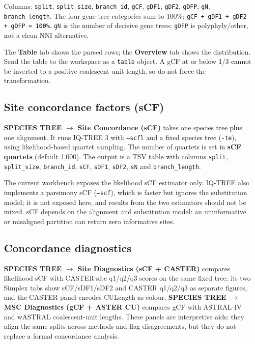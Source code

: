 \documentclass[10pt]{report}
\begin{document}
Columns: \texttt{split}, \texttt{split\_size}, \texttt{branch\_id},
\texttt{gCF}, \texttt{gDF1}, \texttt{gDF2}, \texttt{gDFP}, \texttt{gN},
\texttt{branch\_length}. The four gene-tree categories sum to 100\%:
\texttt{gCF + gDF1 + gDF2 + gDFP = 100\%}. \texttt{gN} is the number of
decisive gene trees; \texttt{gDFP} is polyphyly/other, not a clean NNI
alternative.

The \textbf{Table} tab shows the parsed rows; the \textbf{Overview} tab shows
the distribution. Send the table to the workspace as a \texttt{table} object.
A gCF at or below 1/3 cannot be inverted to a positive coalescent-unit length,
so do not force the transformation.

\subsection{Site concordance factors (sCF)}

\textbf{SPECIES TREE $\rightarrow$ Site Concordance (sCF)} takes one species
tree plus one alignment. It runs IQ-TREE 3 with \texttt{--scfl} and a fixed
species tree (\texttt{-te}), using likelihood-based quartet sampling. The
number of quartets is set in \textbf{sCF quartets} (default 1{,}000). The output
is a TSV table with columns \texttt{split}, \texttt{split\_size},
\texttt{branch\_id}, \texttt{sCF}, \texttt{sDF1}, \texttt{sDF2}, \texttt{sN}
and \texttt{branch\_length}.

The current workbench exposes the likelihood sCF estimator only. IQ-TREE also
implements a parsimony sCF (\texttt{--scf}), which is faster but ignores the
substitution model; it is not exposed here, and results from the two
estimators should not be mixed. sCF depends on the alignment and substitution
model: an uninformative or misaligned partition can return zero informative
sites.

\subsection{Concordance diagnostics}

\textbf{SPECIES TREE $\rightarrow$ Site Diagnostics (sCF + CASTER)} compares
likelihood sCF with CASTER-site q1/q2/q3 scores on the same fixed tree; its
two Simplex tabs show sCF/sDF1/sDF2 and CASTER q1/q2/q3 as separate figures,
and the CASTER panel encodes CULength as colour. \textbf{SPECIES TREE
$\rightarrow$ MSC Diagnostics (gCF + ASTER CU)} compares gCF with ASTRAL-IV and
wASTRAL coalescent-unit lengths. These panels are interpretive aids: they align
the same splits across methods and flag disagreements, but they do not replace
a formal concordance analysis.
\end{document}
